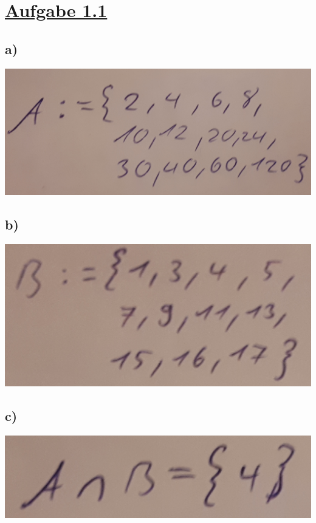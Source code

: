 \section*{\underline{Aufgabe 1.1}}

\subsection*{a)}

\includegraphics[width=\textwidth]{part/S1A1MA}

\subsection*{b)}
\includegraphics[width=\textwidth]{part/S1A1MB}

\subsection*{c)}
\includegraphics[width=\textwidth]{part/S1A1MASB}

